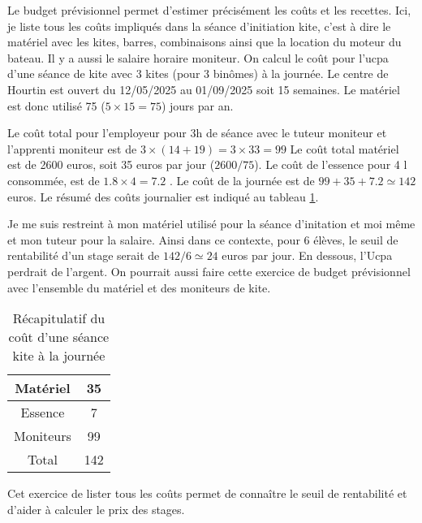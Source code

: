 \documentclass[12pt,a4paper]{report}
\begin{document}
Le budget prévisionnel permet d'estimer précisément les co\^uts et les recettes.
Ici, je liste tous les coûts impliqués dans la séance d’initiation kite, 
c'est  à dire le matériel avec les kites, barres, combinaisons ainsi que
la location du moteur du bateau. Il y a aussi le salaire horaire moniteur. 
On calcul le coût pour l'ucpa
d'une séance de kite avec 3 kites (pour 3 binômes) à la journée.
Le centre de Hourtin est ouvert du 12/05/2025 au 01/09/2025 soit 15 semaines.
Le matériel est donc utilisé 75 ($5\times15=75$) jours par an.

Le coût total pour l'employeur pour 3h de séance avec le tuteur moniteur
et l'apprenti moniteur est de $3\times(14+19) = 3\times33 = 99 $
Le coût total matériel est de 2600 euros, soit 35 euros par jour ($2600/75$).
Le coût de l'essence pour 4 l consommée, est de $1.8\times4 = 7.2$ .
Le coût de la journée est de $99 + 35 + 7.2 \simeq  142 $ euros.
Le résumé des coûts journalier est indiqué au tableau \ref{cout_journalier}.

Je me suis restreint à  mon matériel utilisé pour la séance d'initation
et moi m\^eme et mon tuteur pour la salaire. Ainsi dans ce contexte, 
pour 6 élèves, le seuil de rentabilité d'un stage serait de $142/6 \simeq 24$ euros
par jour. En dessous, l'Ucpa perdrait de l'argent.
On pourrait aussi faire cette exercice de budget prévisionnel avec l'ensemble
du matériel et des moniteurs de kite.

\begin{table}
\begin{tabular}{|c|c|}
\hline
Matériel  & 35 \\
\hline
Essence   & 7   \\
\hline
Moniteurs  & 99 \\
\hline
Total     & 142 \\
\hline
\end{tabular}
\caption{Récapitulatif du co\^ut d'une séance kite à la journée\label{cout_journalier}}
\end{table}

Cet exercice de lister tous les co\^uts permet de connaître le seuil 
de rentabilité et d'aider à calculer le prix des stages.

\end{document}
